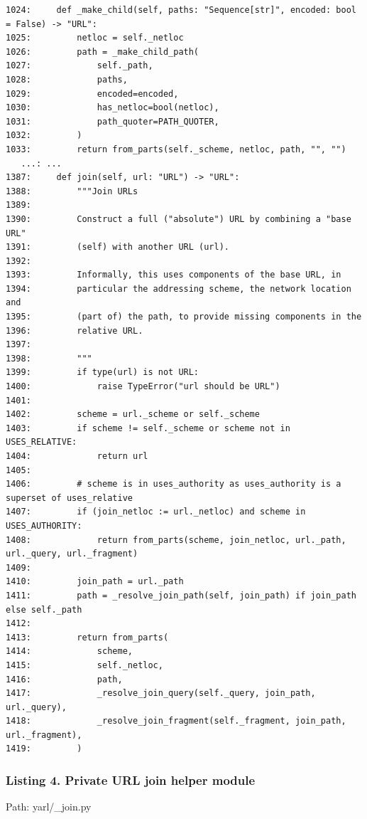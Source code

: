 \documentclass[11pt,a4paper]{article}
\begin{document}
\begin{Verbatim}[breaklines=true,fontsize=\scriptsize]
1024:     def _make_child(self, paths: "Sequence[str]", encoded: bool = False) -> "URL":
1025:         netloc = self._netloc
1026:         path = _make_child_path(
1027:             self._path,
1028:             paths,
1029:             encoded=encoded,
1030:             has_netloc=bool(netloc),
1031:             path_quoter=PATH_QUOTER,
1032:         )
1033:         return from_parts(self._scheme, netloc, path, "", "")
   ...: ...
1387:     def join(self, url: "URL") -> "URL":
1388:         """Join URLs
1389: 
1390:         Construct a full ("absolute") URL by combining a "base URL"
1391:         (self) with another URL (url).
1392: 
1393:         Informally, this uses components of the base URL, in
1394:         particular the addressing scheme, the network location and
1395:         (part of) the path, to provide missing components in the
1396:         relative URL.
1397: 
1398:         """
1399:         if type(url) is not URL:
1400:             raise TypeError("url should be URL")
1401: 
1402:         scheme = url._scheme or self._scheme
1403:         if scheme != self._scheme or scheme not in USES_RELATIVE:
1404:             return url
1405: 
1406:         # scheme is in uses_authority as uses_authority is a superset of uses_relative
1407:         if (join_netloc := url._netloc) and scheme in USES_AUTHORITY:
1408:             return from_parts(scheme, join_netloc, url._path, url._query, url._fragment)
1409: 
1410:         join_path = url._path
1411:         path = _resolve_join_path(self, join_path) if join_path else self._path
1412: 
1413:         return from_parts(
1414:             scheme,
1415:             self._netloc,
1416:             path,
1417:             _resolve_join_query(self._query, join_path, url._query),
1418:             _resolve_join_fragment(self._fragment, join_path, url._fragment),
1419:         )
\end{Verbatim}


\subsubsection*{Listing 4. Private URL join helper module}


Path: yarl/\_join.py
\end{document}
